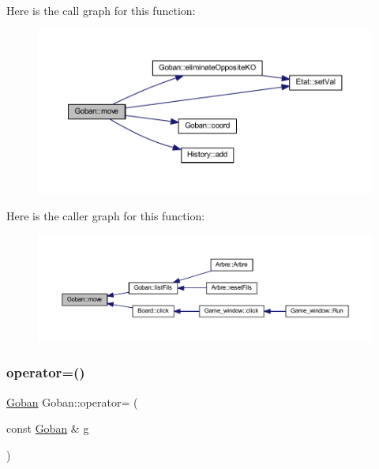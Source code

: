 Here is the call graph for this function\+:
\nopagebreak
\begin{figure}[H]
\begin{center}
\leavevmode
\includegraphics[width=350pt]{class_goban_a7dd1a7b53322bde2a831a923059e43a3_cgraph}
\end{center}
\end{figure}
Here is the caller graph for this function\+:
\nopagebreak
\begin{figure}[H]
\begin{center}
\leavevmode
\includegraphics[width=350pt]{class_goban_a7dd1a7b53322bde2a831a923059e43a3_icgraph}
\end{center}
\end{figure}
\mbox{\label{class_goban_af02f839ac464fc547dd98bc44bae1ef8}} 
\subsubsection{\texorpdfstring{operator=()}{operator=()}}
{\footnotesize\ttfamily \hyperlink{class_goban}{Goban} Goban\+::operator= (\begin{DoxyParamCaption}\item[{const \hyperlink{class_goban}{Goban} \&}]{g }\end{DoxyParamCaption})}

\mbox{\label{class_goban_a39eb0323bdb4f3cb5fc00719dd47f938}} 
